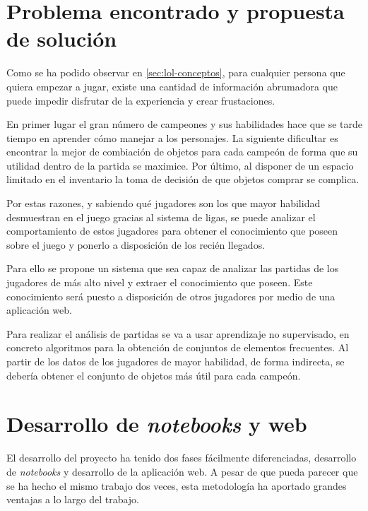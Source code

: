 


\section{Problema encontrado y propuesta de solución}
Como se ha podido observar en \ref{sec:lol-conceptos}, para cualquier persona que quiera empezar a jugar, existe una cantidad de información abrumadora que puede impedir disfrutar de la experiencia y crear frustaciones.

En primer lugar el gran número de campeones y sus habilidades hace que se tarde tiempo en aprender cómo manejar a los personajes. La siguiente dificultar es encontrar la mejor de combiación de objetos para cada campeón de forma que su utilidad dentro de la partida se maximice. Por último, al disponer de un espacio limitado en el inventario la toma de decisión de que objetos comprar se complica.

Por estas razones, y sabiendo qué jugadores son los que mayor habilidad desmuestran en el juego gracias al sistema de ligas, se puede analizar el comportamiento de estos jugadores para obtener el conocimiento que poseen sobre el juego y ponerlo a disposición de los recién llegados.

Para ello se propone un sistema que sea capaz de analizar las partidas de los jugadores de más alto nivel y extraer el conocimiento que poseen. Este conocimiento será puesto a disposición de otros jugadores por medio de una aplicación web.

Para realizar el análisis de partidas se va a usar aprendizaje no supervisado, en concreto algoritmos para la obtención de conjuntos de elementos frecuentes. Al partir de los datos de los jugadores de mayor habilidad, de forma indirecta, se debería obtener el conjunto de objetos más útil para cada campeón.

\section{Desarrollo de \textit{notebooks} y web}
El desarrollo del proyecto ha tenido dos fases fácilmente diferenciadas, desarrollo de \textit{notebooks} y desarrollo de la aplicación web. A pesar de que pueda parecer que se ha hecho el mismo trabajo dos veces, esta metodología ha aportado grandes ventajas a lo largo del trabajo.

